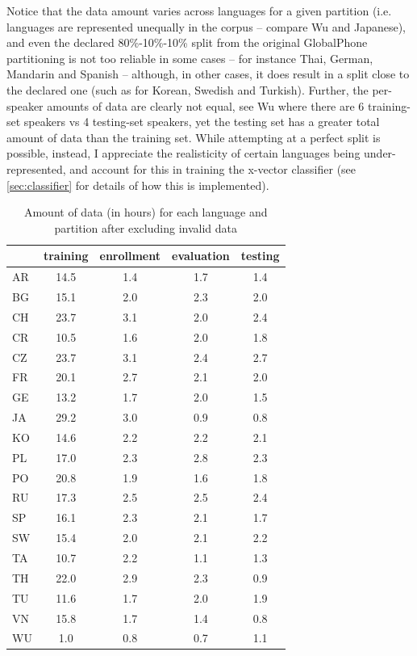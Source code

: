 \documentclass[bsc,frontabs,twoside,singlespacing,parskip,deptreport]{infthesis}
\begin{document}
{{    Notice that the data amount varies across languages for a given partition (i.e. languages are represented unequally in the corpus -- compare Wu and Japanese), and even the declared 80\%-10\%-10\% split from the original GlobalPhone partitioning is not too reliable in some cases -- for instance Thai, German, Mandarin and Spanish -- although, in other cases, it does result in a split close to the declared one (such as for Korean, Swedish and Turkish). Further, the per-speaker amounts of data are clearly not equal, see Wu where there are 6 training-set speakers vs 4 testing-set speakers, yet the testing set has a greater total amount of data than the training set. While attempting at a perfect split is possible, instead, I appreciate the realisticity of certain languages being under-represented, and account for this in training the x-vector classifier (see \autoref{sec:classifier} for details of how this is implemented).

    \begin{table}[h!tb]
      \centering
      \begin{sc}
        \footnotesize
        \begin{tabular}{l|c|c|c|c}
             & training & enrollment & evaluation & testing \\
          \hline
          AR & 14.5 & 1.4 & 1.7 & 1.4\\
          BG & 15.1 & 2.0 & 2.3 & 2.0\\
          CH & 23.7 & 3.1 & 2.0 & 2.4\\
          CR & 10.5 & 1.6 & 2.0 & 1.8\\
          CZ & 23.7 & 3.1 & 2.4 & 2.7\\
          FR & 20.1 & 2.7 & 2.1 & 2.0\\
          GE & 13.2 & 1.7 & 2.0 & 1.5\\
          JA & 29.2 & 3.0 & 0.9 & 0.8\\
          KO & 14.6 & 2.2 & 2.2 & 2.1\\
          PL & 17.0 & 2.3 & 2.8 & 2.3\\
          PO & 20.8 & 1.9 & 1.6 & 1.8\\
          RU & 17.3 & 2.5 & 2.5 & 2.4\\
          SP & 16.1 & 2.3 & 2.1 & 1.7\\
          SW & 15.4 & 2.0 & 2.1 & 2.2\\
          TA & 10.7 & 2.2 & 1.1 & 1.3\\
          TH & 22.0 & 2.9 & 2.3 & 0.9\\
          TU & 11.6 & 1.7 & 2.0 & 1.9\\
          VN & 15.8 & 1.7 & 1.4 & 0.8\\
          WU & 1.0 & 0.8 & 0.7 & 1.1\\
        \end{tabular}
      \end{sc}
      \caption{Amount of data (in hours) for each language and partition after excluding invalid data}
      \label{tab:data-amounts}
    \end{table}
  }

}
\end{document}
